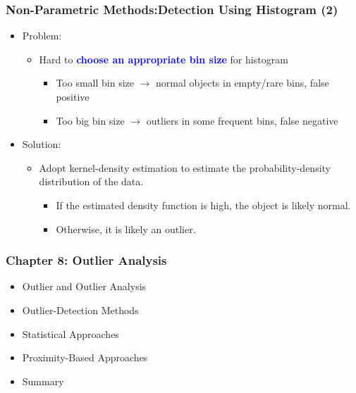 \documentclass[aspectratio=169,t,xcolor=dvipsnames]{beamer}
\newcommand{\blue}[1]{\textbf{\textcolor{blue}{#1}}}
\begin{document}
\begin{frame}
	\frametitle{Non-Parametric Methods:Detection Using Histogram (2)}
	\begin{itemize}
		\item Problem:
		      \begin{itemize}
		      	\item Hard to \blue{choose an appropriate bin size} for histogram
		      	      \begin{itemize}
		      	      	\item Too small bin size $\rightarrow$ normal objects in empty/rare bins, false positive
		      	      	\item Too big bin size $\rightarrow$ outliers in some frequent bins, false negative
		      	      \end{itemize}
		      \end{itemize}
		\item Solution:
		      \begin{itemize}
		      	\item Adopt kernel-density estimation to estimate the probability-density distribution of the data.
		      	      \begin{itemize}
		      	      	\item If the estimated density function is high, the object is likely normal.
		      	      	\item Otherwise, it is likely an outlier.
		      	      \end{itemize}
		      \end{itemize}
	\end{itemize}
\end{frame}

%

\begin{frame}
	\frametitle{Chapter 8: Outlier Analysis}
	\begin{itemize}
		\item Outlier and Outlier Analysis
		\item Outlier-Detection Methods
		\item Statistical Approaches
		\item \alert{Proximity-Based Approaches}
		\item Summary
	\end{itemize}
\end{frame}

%
\end{document}
